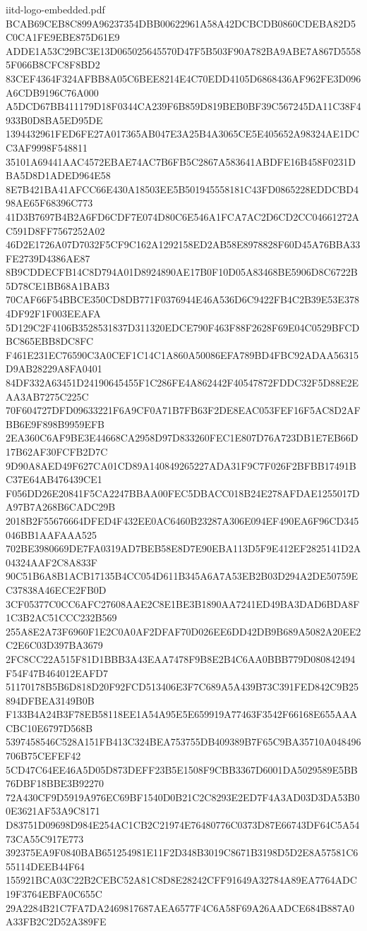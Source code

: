 \begin{filecontents*}[overwrite]{iitd-logo-embedded.pdf}
BCAB69CEB8C899A96237354DBB00622961A58A42DCBCDB0860CDEBA82D5C0CA1FE9EBE875D61E9
ADDE1A53C29BC3E13D065025645570D47F5B503F90A782BA9ABE7A867D55585F066B8CFC8F8BD2
83CEF4364F324AFBB8A05C6BEE8214E4C70EDD4105D6868436AF962FE3D096A6CDB9196C76A000
A5DCD67BB411179D18F0344CA239F6B859D819BEB0BF39C567245DA11C38F4933B0D8BA5ED95DE
1394432961FED6FE27A017365AB047E3A25B4A3065CE5E405652A98324AE1DCC3AF9998F548811
35101A69441AAC4572EBAE74AC7B6FB5C2867A583641ABDFE16B458F0231DBA5D8D1ADED964E58
8E7B421BA41AFCC66E430A18503EE5B501945558181C43FD0865228EDDCBD498AE65F68396C773
41D3B7697B4B2A6FD6CDF7E074D80C6E546A1FCA7AC2D6CD2CC04661272AC591D8FF7567252A02
46D2E1726A07D7032F5CF9C162A1292158ED2AB58E8978828F60D45A76BBA33FE2739D4386AE87
8B9CDDECFB14C8D794A01D8924890AE17B0F10D05A83468BE5906D8C6722B5D78CE1BB68A1BAB3
70CAF66F54BBCE350CD8DB771F0376944E46A536D6C9422FB4C2B39E53E3784DF92F1F003EEAFA
5D129C2F4106B3528531837D311320EDCE790F463F88F2628F69E04C0529BFCDBC865EBB8DC8FC
F461E231EC76590C3A0CEF1C14C1A860A50086EFA789BD4FBC92ADAA56315D9AB28229A8FA0401
84DF332A63451D24190645455F1C286FE4A862442F40547872FDDC32F5D88E2EAA3AB7275C225C
70F604727DFD09633221F6A9CF0A71B7FB63F2DE8EAC053FEF16F5AC8D2AFBB6E9F898B9959EFB
2EA360C6AF9BE3E44668CA2958D97D833260FEC1E807D76A723DB1E7EB66D17B62AF30FCFB2D7C
9D90A8AED49F627CA01CD89A140849265227ADA31F9C7F026F2BFBB17491BC37E64AB476439CE1
F056DD26E20841F5CA2247BBAA00FEC5DBACC018B24E278AFDAE1255017DA97B7A268B6CADC29B
2018B2F55676664DFED4F432EE0AC6460B23287A306E094EF490EA6F96CD345046BB1AAFAAA525
702BE3980669DE7FA0319AD7BEB58E8D7E90EBA113D5F9E412EF2825141D2A04324AAF2C8A833F
90C51B6A8B1ACB17135B4CC054D611B345A6A7A53EB2B03D294A2DE50759EC37838A46ECE2FB0D
3CF05377C0CC6AFC27608AAE2C8E1BE3B1890AA7241ED49BA3DAD6BDA8F1C3B2AC51CCC232B569
255A8E2A73F6960F1E2C0A0AF2DFAF70D026EE6DD42DB9B689A5082A20EE2C2E6C03D397BA3679
2FC8CC22A515F81D1BBB3A43EAA7478F9B8E2B4C6AA0BBB779D080842494F54F47B464012EAFD7
51170178B5B6D818D20F92FCD513406E3F7C689A5A439B73C391FED842C9B25894DFBEA3149B0B
F133B4A24B3F78EB58118EE1A54A95E5E659919A77463F3542F66168E655AAACBC10E6797D568B
5397458546C528A151FB413C324BEA753755DB409389B7F65C9BA35710A048496706B75CEFEF42
5CD47C64EE46A5D05D873DEFF23B5E1508F9CBB3367D6001DA5029589E5BB76DBF18BBE3B92270
72A430CF9D5919A976EC69BF1540D0B21C2C8293E2ED7F4A3AD03D3DA53B00E3621AF53A9C8171
D83751D09698D984E254AC1CB2C21974E76480776C0373D87E66743DF64C5A5473CA55C917E773
392375EA9F0840BAB651254981E11F2D348B3019C8671B3198D5D2E8A57581C655114DEEB44F64
155921BCA03C22B2CEBC52A81C8D8E28242CFF91649A32784A89EA7764ADC19F3764EBFA0C655C
29A2284B21C7FA7DA2469817687AEA6577F4C6A58F69A26AADCE684B887A0A33FB2C2D52A389FE

\end{filecontents*}
